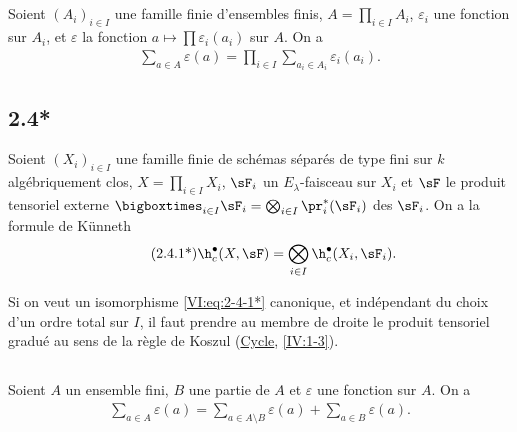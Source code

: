 \subsection{}\label{VI:2-4}

Soient $(A_i)_{i\in I}$ une famille finie d'ensembles finis, 
$A=\prod_{i\in I} A_i$, $\varepsilon_i$ une fonction sur $A_i$, et 
$\varepsilon$ la fonction $a\mapsto \prod \varepsilon_i(a_i)$ sur $A$. On a 
\begin{align*}\tag{2.4.1}\label{VI:eq:2-4-1}
  \sum_{a\in A} \varepsilon(a) = \prod_{i\in I} \sum_{a_i\in A_i} \varepsilon_i(a_i) \text{.}
\end{align*}





\subsection*{2.4*}\label{VI:2-4*}

Soient $(X_i)_{i\in I}$ une famille finie de schémas séparés de type fini 
sur $k$ algébriquement clos, $X=\prod_{i\in I} X_i$, $\sF_i$ un 
$E_\lambda$-faisceau sur $X_i$ et $\sF$ le produit tensoriel externe 
$\bigboxtimes_{i\in I}\sF_i = \bigotimes_{i\in I} \pr_i^\ast(\sF_i)$ 
des $\sF_i$. On a la formule de K\"unneth 
\begin{align*}\tag{2.4.1*}\label{VI:eq:2-4-1*}
  \h_c^\bullet(X,\sF) = \bigotimes_{i\in I} \h_c^\bullet(X_i,\sF_i) \text{.}
\end{align*}

Si on veut un isomorphisme \eqref{VI:eq:2-4-1*} canonique, et indépendant du 
choix d'un ordre total sur $I$, il faut prendre au membre de droite le produit 
tensoriel gradué au sens de la règle de Koszul 
(\hyperref[IV]{Cycle}, \ref{IV:1-3}). 





\subsection{}\label{VI:2-5}

Soient $A$ un ensemble fini, $B$ une partie de $A$ et $\varepsilon$ une 
fonction sur $A$. On a 
\begin{align*}\tag{2.5.1}\label{VI:2-5-1}
  \sum_{a\in A} \varepsilon(a) = \sum_{a\in A\setminus B}\varepsilon(a) + \sum_{a\in B} \varepsilon(a) \text{.}
\end{align*}





